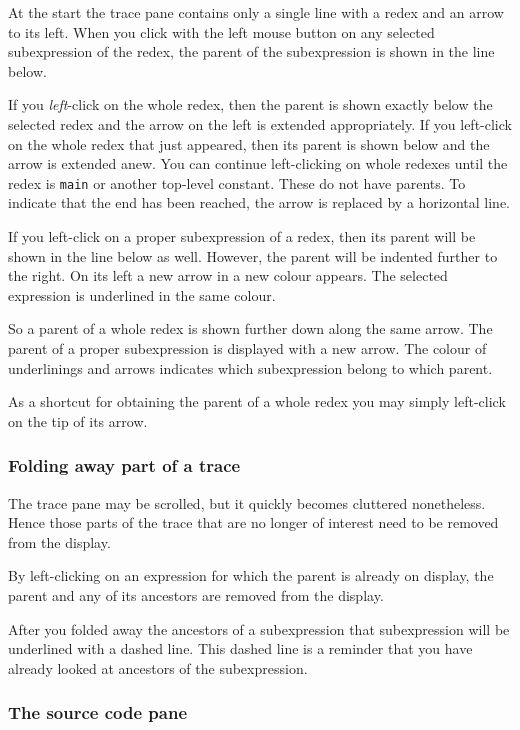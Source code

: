 \documentclass[12pt]{article}
\begin{document}
At the start the trace pane contains only a single line with a redex and an arrow to its left. When you click with the left mouse button on any selected subexpression of the redex, the parent of the subexpression is shown in the line below.

If you \emph{left}-click on the whole redex, then the parent is shown exactly below the selected redex and the arrow on the left is extended appropriately. If you left-click on the whole redex that just appeared, then its parent is shown below and the arrow is extended anew. You can continue left-clicking on whole redexes until the redex is \texttt{main} or another top-level constant. These do not have parents. To indicate that the end has been reached, the arrow is replaced by a horizontal line.

If you left-click on a proper subexpression of a redex, then its parent will be shown in the line below as well. However, the parent will be indented further to the right. On its left a new arrow in a new colour appears. The selected expression is underlined in the same colour. 

So a parent of a whole redex is shown further down along the same arrow.
The parent of a proper subexpression is displayed with a new arrow. The colour of underlinings and arrows indicates which subexpression belong to which parent. 

As a shortcut for obtaining the parent of a whole redex you may simply left-click on the tip of its arrow.


\subsubsection{Folding away part of a trace}

The trace pane may be scrolled, but it quickly becomes cluttered nonetheless. Hence those parts of the trace that are no longer of interest need to be removed from the display.

By left-clicking on an expression for which the parent is already on display,
the parent and any of its ancestors are removed from the display.

After you folded away the ancestors of a subexpression that subexpression will be underlined with a dashed line. This dashed line is a reminder that you have already looked at ancestors of the subexpression.


\subsubsection{The source code pane}\label{source}
\end{document}
